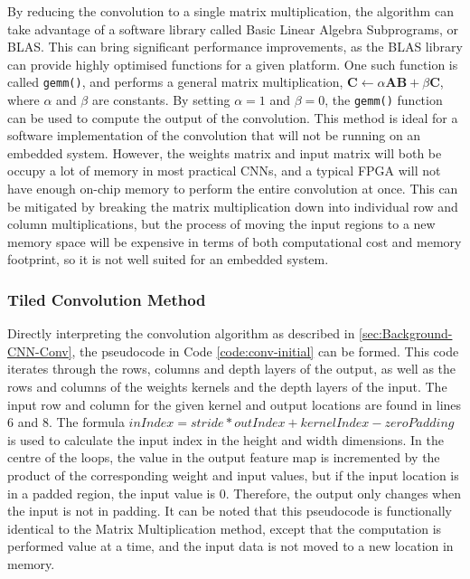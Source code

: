 \documentclass[12pt]{article}
\begin{document}
By reducing the convolution to a single matrix multiplication, the algorithm can take advantage of a software library called Basic Linear Algebra Subprograms, or BLAS. This can bring significant performance improvements, as the BLAS library can provide highly optimised functions for a given platform. One such function is called \lstinline|gemm()|, and performs a general matrix multiplication, $\mathbf{C} \gets \alpha\mathbf{A}\mathbf{B} + \beta\mathbf{C}$, where $\alpha$ and $\beta$ are constants. By setting $\alpha = 1$ and $\beta = 0$, the \lstinline|gemm()| function can be used to compute the output of the convolution. This method is ideal for a software implementation of the convolution that will not be running on an embedded system. However, the weights matrix and input matrix will both be occupy a lot of memory in most practical CNNs, and a typical FPGA will not have enough on-chip memory to perform the entire convolution at once. This can be mitigated by breaking the matrix multiplication down into individual row and column multiplications, but the process of moving the input regions to a new memory space will be expensive in terms of both computational cost and memory footprint, so it is not well suited for an embedded system.

\subsubsection{Tiled Convolution Method}
\label{sec:Design-Conv-TC}

Directly interpreting the convolution algorithm as described in \ref{sec:Background-CNN-Conv}, the pseudocode in Code \ref{code:conv-initial} can be formed. This code iterates through the rows, columns and depth layers of the output, as well as the rows and columns of the weights kernels and the depth layers of the input. The input row and column for the given kernel and output locations are found in lines 6 and 8. The formula $inIndex = stride * outIndex + kernelIndex - zeroPadding$ is used to calculate the input index in the height and width dimensions. In the centre of the loops, the value in the output feature map is incremented by the product of the corresponding weight and input values, but if the input location is in a padded region, the input value is 0. Therefore, the output only changes when the input is not in padding. It can be noted that this pseudocode is functionally identical to the Matrix Multiplication method, except that the computation is performed value at a time, and the input data is not moved to a new location in memory.
\end{document}
